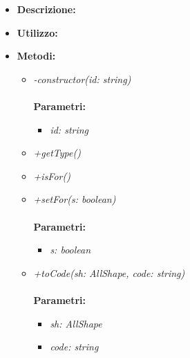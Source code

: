 \begin{itemize}
	\item \textbf{Descrizione:}\\
	
	\item \textbf{Utilizzo:}\\
	
	\item \textbf{Metodi:}
		\begin{itemize}
			\item \emph{-constructor(id: string)}\\
    		\\
    		\textbf{Parametri:}
    		\begin{itemize}
    			\item \emph{id: string}\\
    			
    		\end{itemize}
    		\item \emph{+getType()}\\
    		
    		\item \emph{+isFor()}\\
    		
    		\item \emph{+setFor(s: boolean)}\\
    		\\
    		\textbf{Parametri:}
    		\begin{itemize}
    			\item \emph{s: boolean}\\
    			
    		\end{itemize}
    		\item \emph{+toCode(sh: AllShape, code: string)}\\
    		\\
    		\textbf{Parametri:}
    		\begin{itemize}
    			\item \emph{sh: AllShape}\\
    			
    			\item \emph{code: string}\\
    			
    		\end{itemize}
    	\end{itemize}
\end{itemize}